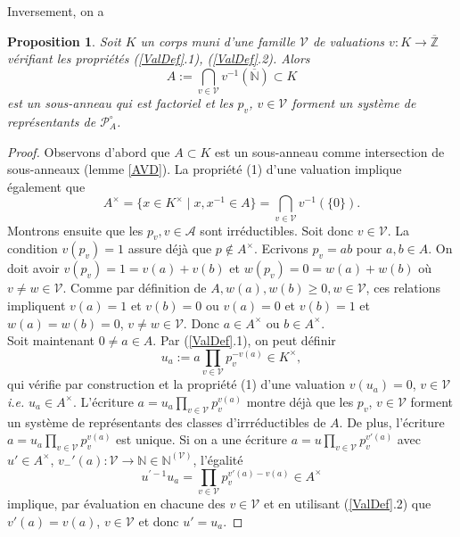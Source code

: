 \documentclass[a4paper, oneside, 12pt]{book}
\theoremstyle{theoremeStyle} %
\newtheorem{proposition}[theoreme]{Proposition}
\theoremstyle{definition} %
\newcommand{\ie}{\textit{i.e.}} %
\newcommand{\Z}{\mathbb{Z}}
\newcommand{\N}{\mathbb{N}}
\begin{document}
Inversement, on a


\begin{proposition}
  Soit $K$ un corps muni d'une famille $\mathcal{V}$ de valuations $v:K\rightarrow \overline{\Z}$ vérifiant les propriétés (\ref{ValDef}.1), (\ref{ValDef}.2). Alors $$A:=\displaystyle{\bigcap_{v\in\mathcal{V}}}v^{-1}(\overline{\N})\subset K$$ est un sous-anneau qui est factoriel et les $p_v$, $v\in\mathcal{V}$ forment un système de représentants de $\mathcal{P}_A^\circ$.
\end{proposition}

\begin{proof}Observons d'abord que  $A\subset K$ est un sous-anneau comme intersection de sous-anneaux (lemme \ref{AVD}). La propriété (1) d'une valuation implique également que $$A^\times=\{ x\in K^\times\;|\; x,x^{-1}\in A\} =\displaystyle{\bigcap_{v\in\mathcal{V}}v^{-1}(\{0\})}.$$
 Montrons ensuite que les $p_v, v\in\mathcal{A}$ sont irréductibles. Soit donc $v\in \mathcal{V}$. La condition $v(p_v)=1$ assure déjà que $p\notin A^\times$. Ecrivons $p_v=ab$ pour $a,b\in A$. On doit avoir $v(p_v)=1=v(a)+v(b)$ et $w(p_v)=0=w(a)+w(b)$ où $v\not=w\in\mathcal{V}$. Comme par définition de $A, w(a),w(b)\geq 0, w\in\mathcal{V}$, ces relations impliquent $v(a)=1$ et $v(b)=0$ ou $v(a)=0$ et $v(b)=1$ et $w(a)=w(b)=0$, $v\not=w\in\mathcal{V}$. Donc $a\in A^\times$ ou $b\in A^\times$.\\
 Soit maintenant $0\not=a\in A$. Par (\ref{ValDef}.1), on peut définir  $$u_a:=a\prod_{v\in\mathcal{V}}p_v^{-v(a)}\in K^\times,$$
qui vérifie par construction et la propriété (1) d'une valuation $v(u_a)=0$, $v\in\mathcal{V}$ \ie{} $u_a\in A^\times$. L'écriture  $a=u_a\prod_{v\in\mathcal{V}}p_v^{v(a)}$ montre déjà que les $p_v$, $v\in\mathcal{V}$ forment  un système de représentants des classes d'irrréductibles de $A$. De plus, l'écriture $a=u_a\prod_{v\in\mathcal{V}}p_v^{v(a)}$ est unique. Si on a une écriture $a=u\prod_{v\in\mathcal{V}}p_v^{v'(a)}$
avec $u'\in A^\times$, $v_-'(a):\mathcal{V}\rightarrow \N\in\N^{(\mathcal{V})}$, l'égalité
 $$u^{'-1} u_a=\prod_{v\in\mathcal{V}}p_v^{v'(a)-v(a)}\in A^\times$$
implique, par évaluation en chacune des $v\in\mathcal{V}$ et en utilisant (\ref{ValDef}.2) que $v'(a)=v(a)$, $v\in\mathcal{V}$ et donc $u'=u_a$.
\end{proof}
\end{document}
